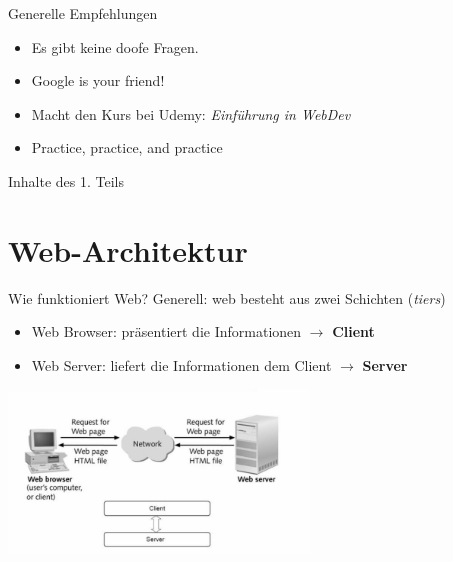 \documentclass[12pt,xcolor={rgb}]{beamer}
\begin{document}
\begin{frame}{Generelle Empfehlungen}
\begin{itemize}
\item Es gibt keine doofe Fragen. 
\item Google is your friend!
\item Macht den Kurs bei Udemy: \textit{Einführung in WebDev}
\item Practice, practice, and practice
\end{itemize}
\end{frame}


\begin{frame}[plain]{Inhalte des 1. Teils}
\tableofcontents
\end{frame}

\section{Web-Architektur}

\begin{frame}{Wie funktioniert Web?}
Generell: web besteht aus zwei Schichten (\textit{tiers})\\

\begin{itemize}
\item Web Browser: präsentiert die Informationen $\rightarrow$ \textbf{Client} 
\item Web Server: liefert die Informationen dem Client $\rightarrow$ \textbf{Server}
\end{itemize}

\includegraphics[width=8cm]{imgs/introduction-to-web-architecture.jpg}

\end{frame}
\end{document}
